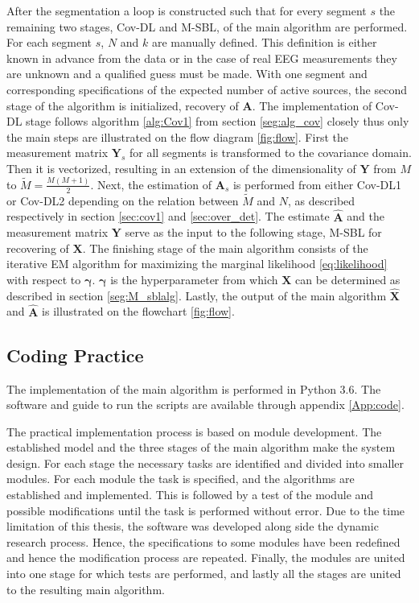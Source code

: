 After the segmentation a loop is constructed such that for every segment $s$ the remaining two stages, Cov-DL and M-SBL, of the main algorithm are performed. 
For each segment $s$, $N$ and $k$ are manually defined. 
This definition is either known in advance from the data or in the case of real EEG measurements they are unknown and a qualified guess must be made.
With one segment and corresponding specifications of the expected number of active sources, the second stage of the algorithm is initialized, recovery of $\mathbf{A}$.
The implementation of Cov-DL stage follows algorithm \ref{alg:Cov1} from section \ref{seg:alg_cov} closely thus only the main steps are illustrated on the flow diagram \ref{fig:flow}.
First the measurement matrix $\mathbf{Y}_s$ for all segments is transformed to the covariance domain. Then it is vectorized, resulting in an extension of the dimensionality of $\mathbf{Y}$ from $M$ to $\widetilde{M} = \frac{M(M+1)}{2}$.
Next, the estimation of $\mathbf{A}_s$ is performed from either Cov-DL1 or Cov-DL2 depending on the relation between $\widetilde{M}$ and $N$, as described respectively in section \ref{sec:cov1} and \ref{sec:over_det}.
The estimate $\hat{\mathbf{A}}$ and the measurement matrix $\mathbf{Y}$ serve as the input to the following stage, M-SBL for recovering of $\mathbf{X}$. 
The finishing stage of the main algorithm consists of the iterative EM algorithm for maximizing the marginal likelihood \eqref{eq:likelihood} with respect to $\boldsymbol{\gamma}$. $\boldsymbol{\gamma}$ is the hyperparameter from which $\mathbf{X}$ can be determined as described in section \ref{seg:M_sblalg}. 
Lastly, the output of the main algorithm $\hat{\mathbf{X}}$ and $\hat{\mathbf{A}}$ is illustrated on the flowchart \ref{fig:flow}.

\subsection{Coding Practice}
The implementation of the main algorithm is performed in Python 3.6. The software and guide to run the scripts are available through appendix \ref{App:code}.

The practical implementation process is based on module development. 
The established model and the three stages of the main algorithm make the system design. 
For each stage the necessary tasks are identified and divided into smaller modules. 
For each module the task is specified, and the algorithms are established and implemented. 
This is followed by a test of the module and possible modifications until the task is performed without error. 
Due to the time limitation of this thesis, the software was developed along side the dynamic research process. 
Hence, the specifications to some modules have been redefined and hence the modification process are repeated. 
Finally, the modules are united into one stage for which tests are performed, and lastly all the stages are united to the resulting main algorithm.

